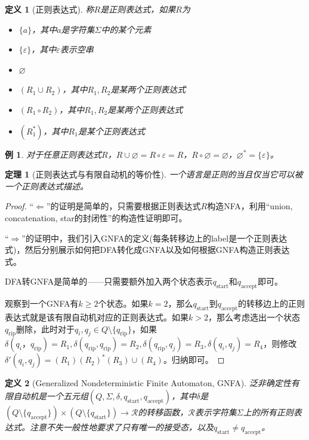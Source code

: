 \documentclass[8pt]{article}
\theoremstyle{compact}
\newtheorem{theorem}{定理}
\newtheorem{definition}{定义}
\newtheorem{example}{例}
\def\ge{\geqslant}
\begin{document}
\begin{definition}[正则表达式]
	称$R$是正则表达式，如果$R$为
	\begin{itemize}
		\item $\{a\}$，其中$a$是字符集$\Sigma$中的某个元素
		\item $\{\varepsilon\}$，其中$\varepsilon$表示空串
		\item $\varnothing$
		\item $(R_1 \cup R_2)$，其中$R_1, R_2$是某两个正则表达式
		\item $(R_1 \circ R_2)$，其中$R_1, R_2$是某两个正则表达式
		\item $(R_1^*)$，其中$R_1$是某个正则表达式
	\end{itemize}
\end{definition}
\begin{example}
	对于任意正则表达式$R$，$R \cup \varnothing = R \circ \varepsilon = R$，$R \circ \varnothing = \varnothing$，$\varnothing^* = \{\varepsilon\}$。
\end{example}
\begin{theorem}[正则表达式与有限自动机的等价性]
	一个语言是正则的当且仅当它可以被一个正则表达式描述。
\end{theorem}
\begin{proof}
	“$\Leftarrow$”的证明是简单的，只需要根据正则表达式$R$构造NFA，利用“union, concatenation, star的封闭性”的构造性证明即可。

	“$\Rightarrow$”的证明中，我们引入GNFA的定义(每条转移边上的label是一个正则表达式)，然后分别展示如何把DFA转化成GNFA以及如何根据GNFA构造正则表达式。

	DFA转GNFA是简单的——只需要额外加入两个状态表示$q_{\text{start}}$和$q_{\text{accept}}$即可。

	观察到一个GNFA有$k \ge 2$个状态。如果$k=2$，那么$q_{\text{start}}$到$q_{\text{accept}}$的转移边上的正则表达式就是该有限自动机对应的正则表达式。如果$k > 2$，那么考虑选出一个状态$q_{\text{rip}}$删除，此时对于$q_i, q_j \in Q \setminus \{q_{\text{rip}}\}$，如果$\delta(q_i， q_{\text{rip}}) = R_1, \delta(q_{\text{rip}}, q_{\text{rip}}) = R_2, \delta(q_{\text{rip}}, q_j) = R_3, \delta(q_i, q_j) = R_4$，则修改$\delta'(q_i, q_j) = (R_1)(R_2)^*(R_3) \cup (R_4)$。归纳即可。
\end{proof}
\begin{definition}[Generalized Nondeterministic Finite Automaton, GNFA]
	泛非确定性有限自动机是一个五元组$(Q, \Sigma, \delta, q_{\text{start}}, q_{\text{accept}})$，其中$\delta$是$(Q \setminus \{q_{\text{accept}}\}) \times (Q \setminus \{q_{\text{start}}\}) \to \mathcal R$的转移函数，$\mathcal R$表示字符集$\Sigma$上的所有正则表达式。注意不失一般性地要求了只有唯一的接受态，以及$q_{\text{start}} \neq q_{\text{accept}}$。
\end{definition}
\end{document}
